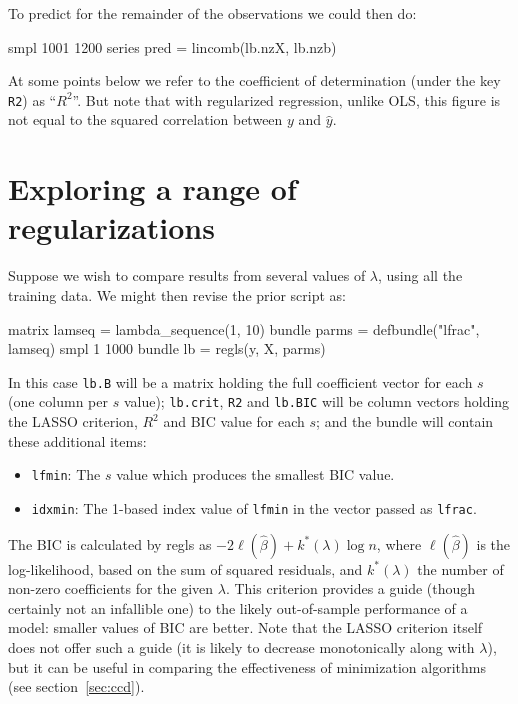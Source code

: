 \documentclass{article}
\begin{document}
To predict for the remainder of the observations we could then do:
\begin{code}
smpl 1001 1200
series pred = lincomb(lb.nzX, lb.nzb)
\end{code}

At some points below we refer to the coefficient of determination
(under the key \texttt{R2}) as ``$R^2$''. But note that with
regularized regression, unlike OLS, this figure is not equal to the
squared correlation between $y$ and $\hat{y}$.

\section{Exploring a range of regularizations}
\label{sec:simple-search}

Suppose we wish to compare results from several values of $\lambda$,
using all the training data. We might then revise the prior script as:
\begin{code}
matrix lamseq = lambda_sequence(1, 10)
bundle parms = defbundle("lfrac", lamseq)
smpl 1 1000
bundle lb = regls(y, X, parms)
\end{code}

In this case \texttt{lb.B} will be a matrix holding the full
coefficient vector for each $s$ (one column per $s$ value);
\texttt{lb.crit}, \texttt{R2} and \texttt{lb.BIC} will be column
vectors holding the LASSO criterion, $R^2$ and BIC value for each
$s$; and the bundle will contain these additional items:
\begin{itemize}
\item \texttt{lfmin}: The $s$ value which produces the smallest BIC
  value.
\item \texttt{idxmin}: The 1-based index value of \texttt{lfmin} in
  the vector passed as \texttt{lfrac}.
\end{itemize}

The BIC \citep{schwarz78} is calculated by \textsf{regls} as
$-2\ell(\hat{\beta}) + k^*(\lambda) \log n$, where $\ell(\hat{\beta})$
is the log-likelihood, based on the sum of squared residuals, and
$k^*(\lambda)$ the number of non-zero coefficients for the given
$\lambda$. This criterion provides a guide (though certainly not an
infallible one) to the likely out-of-sample performance of a model:
smaller values of BIC are better. Note that the LASSO criterion itself
does not offer such a guide (it is likely to decrease monotonically
along with $\lambda$), but it can be useful in comparing the
effectiveness of minimization algorithms (see section~\ref{sec:ccd}).
\end{document}
